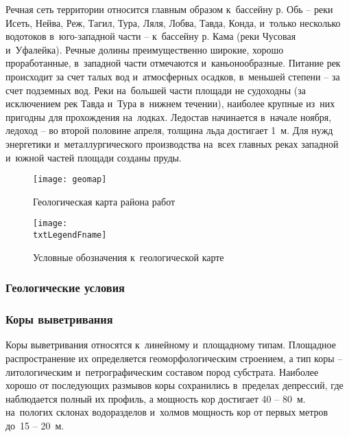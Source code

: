 Речная сеть территории относится главным образом к~бассейну р. Обь  --  реки Исеть, Нейва, Реж, Тагил, Тура, Ляля, Лобва, Тавда, Конда, и~только несколько водотоков в~юго-западной части  --  к~бассейну р. Кама (реки Чусовая и~Уфалейка). Речные долины преимущественно широкие, хорошо проработанные, в~западной части отмечаются и~каньонообразные. Питание рек происходит за счет талых вод и~атмосферных осадков, в~меньшей степени  --  за счет подземных вод. Реки на~большей части площади не судоходны (за исключением рек Тавда и~Тура в~нижнем течении), наиболее крупные из~них пригодны для прохождения на~лодках. Ледостав начинается в~начале ноября, ледоход  --  во второй половине апреля, толщина льда достигает 1~м. Для нужд энергетики и~металлургического производства на~всех
главных реках западной и~южной частей площади созданы пруды.

\begin{figure}[h]
	\centering
	\texttt{[image: geomap]}
	\caption{Геологическая карта района работ}
\end{figure}

\begin{figure}[!h]
	\centering
	\texttt{[image: \\txtLegendFname]}
	\caption[Условные обозначения]{Условные обозначения к~геологической карте}
	\label{img:legend}
\end{figure}

\subsubsection{Геологические условия}
\txtGeology

\subsubsection*{Коры выветривания}
Коры выветривания относятся к~линейному и~площадному типам. Площадное распространение их определяется геоморфологическим строением, а тип коры  --  литологическим и~петрографическим составом пород субстрата. Наиболее хорошо от последующих размывов коры сохранились в~пределах депрессий, где наблюдается полный их профиль, а  мощность кор достигает 40  --  80~м. на~пологих склонах водоразделов и~холмов мощность кор от первых метров до~15 -- 20~м.

